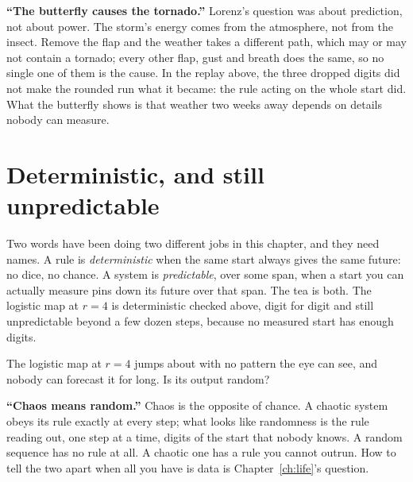 \begin{trapbox}
\textbf{\enquote{The butterfly causes the tornado.}} Lorenz's question was
about prediction, not about power. The storm's energy comes from the
atmosphere, not from the insect. Remove the flap and the weather takes a
different path, which may or may not contain a tornado; every other flap,
gust and breath does the same, so no single one of them is the cause. In
the replay above, the three dropped digits did not make the rounded run what
it became: the rule acting on the whole start did. What the butterfly shows
is that weather two weeks away depends on details nobody can measure.
\end{trapbox}

\section{Deterministic, and still unpredictable}
\label{sec:ch06-determinism}

\noindent
Two words have been doing two different jobs in this chapter, and they need
names. A rule is \emph{deterministic} when the same start always gives the
same future: no dice, no chance. A system is \emph{predictable}, over some
span, when a start you can actually measure pins down its future over that
span. The tea is both. The logistic map at $r = 4$ is deterministic \dash{}
checked above, digit for digit \dash{} and still unpredictable beyond a few
dozen steps, because no measured start has enough digits.

\begin{think}
The logistic map at $r = 4$ jumps about with no pattern the eye can see, and
nobody can forecast it for long. Is its output random?
\end{think}

\begin{trapbox}
\textbf{\enquote{Chaos means random.}} Chaos is the opposite of chance. A
chaotic system obeys its rule exactly at every step; what looks like
randomness is the rule reading out, one step at a time, digits of the start
that nobody knows. A random sequence has no rule at all. A chaotic one has a
rule you cannot outrun. How to tell the two apart when all you have is data
is Chapter~\ref{ch:life}'s question.
\end{trapbox}


